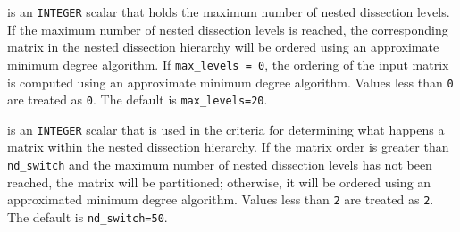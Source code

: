 \documentclass{stfc}
\begin{document}
\begin{description}





 is an {\tt INTEGER} scalar that holds the maximum number
of nested dissection levels. If the maximum number of nested dissection levels 
is reached, the corresponding matrix in the nested dissection hierarchy 
will be ordered using an approximate minimum degree algorithm. If 
{\tt max\_levels = 0}, the ordering of the input matrix is computed 
using an approximate minimum degree algorithm.  Values less
than {\tt 0} are treated as {\tt 0}.  The default is {\tt max\_levels=20}.



 is an {\tt INTEGER} scalar that is used in the criteria for 
determining what happens a matrix within the nested dissection hierarchy. If 
the matrix order is greater than {\tt nd\_switch} and the maximum number of 
nested dissection levels has not been reached, the matrix will be 
partitioned; otherwise, it will be ordered using an approximated minimum 
degree algorithm. Values less than {\tt 2} are treated as {\tt 2}.  The 
default is {\tt nd\_switch=50}.



\end{description}
\end{document}
